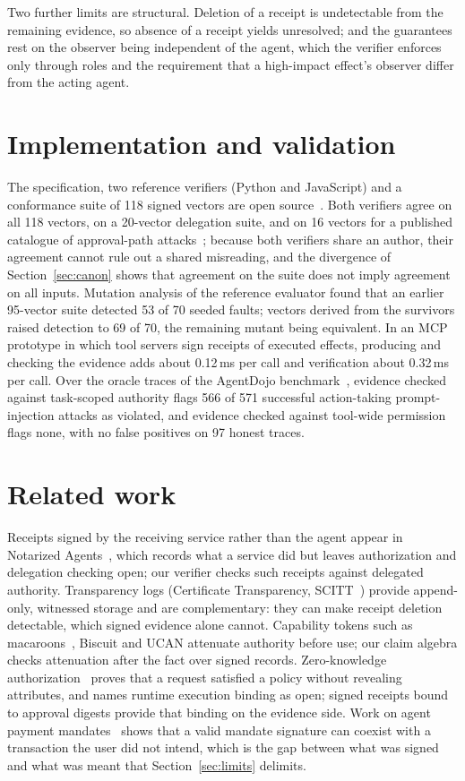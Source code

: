 \documentclass[11pt,a4paper]{article}
\theoremstyle{definition}
\theoremstyle{remark}
\newcommand{\viol}{\textsf{violated}}
\newcommand{\unres}{\textsf{unresolved}}
\begin{document}
Two further limits are structural. Deletion of a receipt is undetectable from the remaining evidence, so absence of a receipt yields \unres{}; and the guarantees rest on the observer being independent of the agent, which the verifier enforces only through roles and the requirement that a high-impact effect's observer differ from the acting agent.

\section{Implementation and validation}

The specification, two reference verifiers (Python and JavaScript) and a conformance suite of 118 signed vectors are open source~\cite{amep}. Both verifiers agree on all 118 vectors, on a 20-vector delegation suite, and on 16 vectors for a published catalogue of approval-path attacks~\cite{kodathala2026approve}; because both verifiers share an author, their agreement cannot rule out a shared misreading, and the divergence of Section~\ref{sec:canon} shows that agreement on the suite does not imply agreement on all inputs. Mutation analysis of the reference evaluator found that an earlier 95-vector suite detected 53 of 70 seeded faults; vectors derived from the survivors raised detection to 69 of 70, the remaining mutant being equivalent. In an MCP prototype in which tool servers sign receipts of executed effects, producing and checking the evidence adds about 0.12\,ms per call and verification about 0.32\,ms per call. Over the oracle traces of the AgentDojo benchmark~\cite{agentdojo}, evidence checked against task-scoped authority flags 566 of 571 successful action-taking prompt-injection attacks as \viol{}, and evidence checked against tool-wide permission flags none, with no false positives on 97 honest traces.

\section{Related work}

Receipts signed by the receiving service rather than the agent appear in Notarized Agents~\cite{figuera2026notarized}, which records what a service did but leaves authorization and delegation checking open; our verifier checks such receipts against delegated authority. Transparency logs (Certificate Transparency, SCITT~\cite{scitt}) provide append-only, witnessed storage and are complementary: they can make receipt deletion detectable, which signed evidence alone cannot. Capability tokens such as macaroons~\cite{macaroons}, Biscuit and UCAN attenuate authority before use; our claim algebra checks attenuation after the fact over signed records. Zero-knowledge authorization~\cite{llambi2026zk} proves that a request satisfied a policy without revealing attributes, and names runtime execution binding as open; signed receipts bound to approval digests provide that binding on the evidence side. Work on agent payment mandates~\cite{aviv2026mandate} shows that a valid mandate signature can coexist with a transaction the user did not intend, which is the gap between what was signed and what was meant that Section~\ref{sec:limits} delimits.
\end{document}
